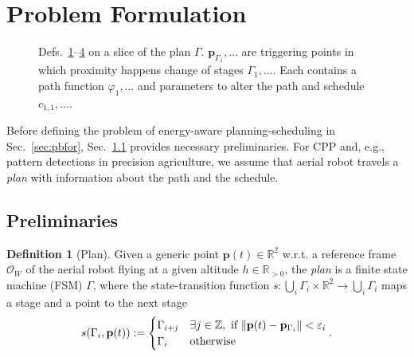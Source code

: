 \documentclass[letterpaper,10pt,journal,twoside]{IEEEtran}
\newcommand{\figpath}{./figures}
\DeclarePairedDelimiter\norm{\lVert}{\rVert}%
\theoremstyle{definition}
\newtheorem{defn}{Definition}[section]
\begin{document}
\section{Problem Formulation}  %
\label{sec:prob}               %
\begin{figure}[t]
  \footnotesize
  \begin{minipage}[l]{0.35\columnwidth}
    \caption{Defs.~\ref{def:plan}--\hyperref[def:trigs]{4} on a slice of the plan $\Gamma$. $\mathbf{p}_{\Gamma_1},\dots$ are triggering points in which proximity happens change of stages $\Gamma_1,\dots$. Each contains a path function $\varphi_1,\dots$ and parameters to alter the path and schedule $c_{1,1},\dots$.}
    \label{fig:traj1}
  \end{minipage}\hfill
  \begin{minipage}[c]{0.6\columnwidth}
    \centering
    \vspace*{-4.5ex}
    
  \end{minipage}
  \vspace*{-4.5ex}
\end{figure}

Before defining the problem of energy-aware planning-scheduling in Sec.~\ref{sec:pbfor}, Sec.~\ref{sec:prelim} provides necessary preliminaries. For CPP and, e.g., pattern detections in precision agriculture, we assume that aerial robot travels a \emph{plan} with information about the path and the schedule.

\vspace*{-2ex}
\subsection{Preliminaries}
\label{sec:prelim}

\begin{defn}[Plan]\label{def:plan}
  Given a generic point $\mathbf{p}(t)\in\mathbb{R}^2$ w.r.t. a reference frame $\mathcal{O}_W$ of the aerial robot flying at a given altitude $h\in\mathbb{R}_{>0}$, the \emph{plan} is a finite state machine (FSM) $\Gamma$, where the state-transition function $s:\bigcup_i{\Gamma_i}\times\mathbb{R}^2\rightarrow\bigcup_i{\Gamma_i}$ maps a stage and a point to the next stage
  \begin{equation*}s(\Gamma_i,\mathbf{p}(t)):=\begin{cases}
    \Gamma_{i+j} & \exists j\in\mathbb{Z},\text{ if }\norm{\mathbf{p}(t)-\mathbf{p}_{\Gamma_i}}<\varepsilon_i\\
    \Gamma_i & \text{otherwise}
  \end{cases}.\end{equation*}
\end{defn}
\end{document}
